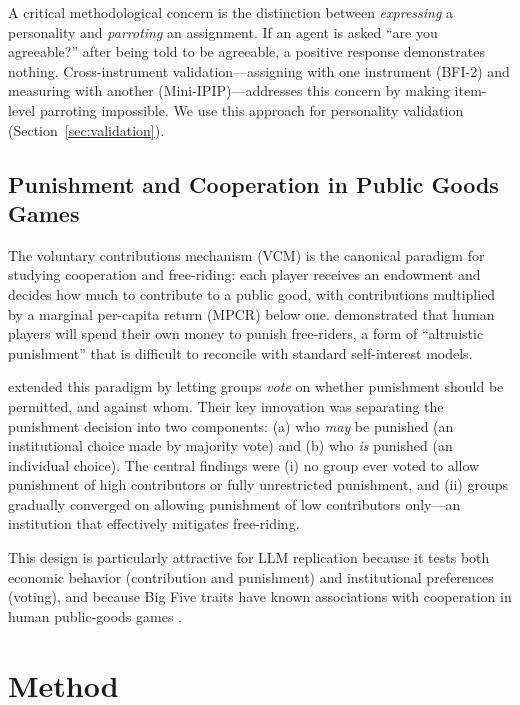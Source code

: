 \documentclass[12pt, a4paper]{article}
\begin{document}
A critical methodological concern is the distinction between \emph{expressing} a personality and \emph{parroting} an assignment. If an agent is asked ``are you agreeable?'' after being told to be agreeable, a positive response demonstrates nothing. Cross-instrument validation---assigning with one instrument (BFI-2) and measuring with another (Mini-IPIP)---addresses this concern by making item-level parroting impossible. We use this approach for personality validation (Section~\ref{sec:validation}).

\subsection{Punishment and Cooperation in Public Goods Games}

The voluntary contributions mechanism (VCM) is the canonical paradigm for studying cooperation and free-riding: each player receives an endowment and decides how much to contribute to a public good, with contributions multiplied by a marginal per-capita return (MPCR) below one. \citet{fehr2002altruistic} demonstrated that human players will spend their own money to punish free-riders, a form of ``altruistic punishment'' that is difficult to reconcile with standard self-interest models.

\citet{ertan2009who} extended this paradigm by letting groups \emph{vote} on whether punishment should be permitted, and against whom. Their key innovation was separating the punishment decision into two components: (a) who \emph{may} be punished (an institutional choice made by majority vote) and (b) who \emph{is} punished (an individual choice). The central findings were (i) no group ever voted to allow punishment of high contributors or fully unrestricted punishment, and (ii) groups gradually converged on allowing punishment of low contributors only---an institution that effectively mitigates free-riding.

This design is particularly attractive for LLM replication because it tests both economic behavior (contribution and punishment) and institutional preferences (voting), and because Big Five traits have known associations with cooperation in human public-goods games \citep{volk2012personality}.

\section{Method}
\end{document}
